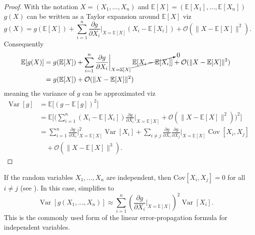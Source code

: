\begin{proof}
	With the notation $X = (X_1, \dots, X_n)$ and $\mathbb{E}[X] = (\mathbb{E}[X_1], \dots, \mathbb{E}[X_n])$ $g(X)$ can be written as a Taylor expansion around $\mathbb{E}[X]$ viz
	\begin{equation}
		g(X) = g(\mathbb{E}[X]) + \sum_{i=1}^n  \frac{\partial g}{\partial X_i} \bigg|_{X = \mathbb{E}[X]} (X_i - \mathbb{E}[X_i]) + \mathcal{O}(\|X - \mathbb{E}[X]\|^2).
		\label{e1}
	\end{equation}
	Consequently
	\begin{equation}
		\begin{split}
			\mathbb{E}[g(X)] &= g(\mathbb{E}[X])+ \sum_{i=1}^n \frac{\partial g}{\partial X_i} \bigg|_{X = \mathbb{E}[X]}\, \cancelto{0}{\mathbb{E}[X_i - \mathbb{E}[X_i]]}  + \mathcal{O}(\|X - \mathbb{E}[X]\|^2)\\
			& = g(\mathbb{E}[X]) + \mathcal{O}(\|X - \mathbb{E}[X]\|^2)\\
		\end{split}
		\label{e2}
	\end{equation}
	meaning the variance of $g$ can be approximated viz
	\begin{equation}
		\begin{split}
			\operatorname{Var}[g] &= \mathbb{E}\big[(g - \mathbb{E}[g])^2\big] \\
			&= \mathbb{E}\bigg[\bigg( \sum_{i=1}^n (X_i - \mathbb{E}[X_i]) \frac{\partial g}{\partial X_i}\bigg|_{X=\mathbb{E}[X]} + \mathcal{O}(\|X - \mathbb{E}[X]\|^2)\bigg)^2\bigg] \\
			&= \sum_{i=1}^n  \frac{\partial g}{\partial X_i}\bigg|_{X = \mathbb{E}[X]}^2\operatorname{Var}[X_i] + \sum_{i \neq j} \frac{\partial g}{\partial X_i} \frac{\partial g}{\partial X_j}\bigg|_{X=\mathbb{E}[X]} \operatorname{Cov}[X_i, X_j]\\
			&\quad + \mathcal{O}(\|X - \mathbb{E}[X]\|^3).
		\end{split}
	\end{equation}
\end{proof}

\begin{remark}
	\label{remark:error_prop_independent}
	If the random variables $X_1, \dots, X_n$ are independent, then $\mathrm{Cov}[X_i, X_j] = 0$ for all \(i \neq j\) (see ). In this case,  simplifies to
	\begin{equation}
		\operatorname{Var}[g(X_1, \dots, X_n)] \approx \sum_{i=1}^n \left(\frac{\partial g}{\partial X_i}\Big|_{X = \mathbb{E}[X]}\right)^2 \operatorname{Var}[X_i].
	\end{equation}
	This is the commonly used form of the linear error-propagation formula for independent variables.
\end{remark}

